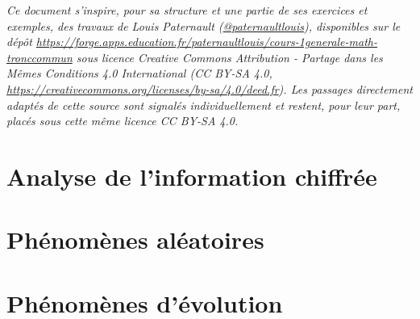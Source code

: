 \documentclass[a4paper,11pt,french]{report}
\begin{document}
\tableofcontents

\vspace{1em}
\begin{center}
\begin{minipage}{0.9\linewidth}
\footnotesize\itshape
Ce document s'inspire, pour sa structure et une partie de ses exercices et exemples, des travaux de Louis Paternault (\href{https://forge.apps.education.fr/paternaultlouis}{@paternaultlouis}), disponibles sur le dépôt \url{https://forge.apps.education.fr/paternaultlouis/cours-1generale-math-tronccommun} sous licence Creative Commons Attribution - Partage dans les Mêmes Conditions 4.0 International (CC BY-SA 4.0, \url{https://creativecommons.org/licenses/by-sa/4.0/deed.fr}). Les passages directement adaptés de cette source sont signalés individuellement et restent, pour leur part, placés sous cette même licence CC BY-SA 4.0.
\end{minipage}
\end{center}
\vspace{1em}

\part{Analyse de l'information chiffrée}



\part{Phénomènes aléatoires}



\part{Phénomènes d'évolution}






\end{document}
